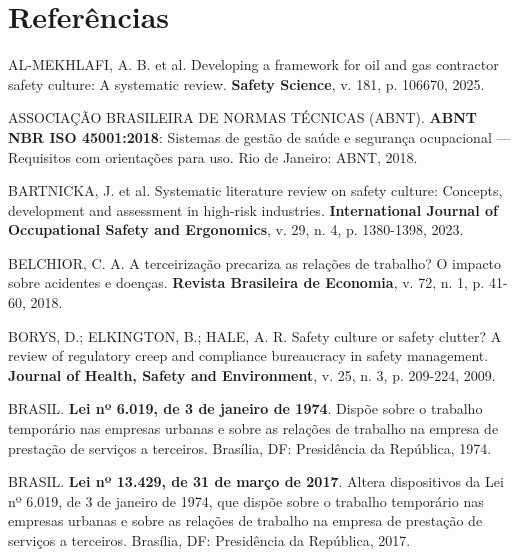 \documentclass[12pt,a4paper]{article}
\begin{document}
\section*{Referências}

\singlespacing
\fontsize{10}{12}\selectfont

\noindent AL-MEKHLAFI, A. B. et al. Developing a framework for oil and gas contractor safety culture: A systematic review. \textbf{Safety Science}, v. 181, p. 106670, 2025.

\vspace{0.25cm}
\noindent ASSOCIAÇÃO BRASILEIRA DE NORMAS TÉCNICAS (ABNT). \textbf{ABNT NBR ISO 45001:2018}: Sistemas de gestão de saúde e segurança ocupacional — Requisitos com orientações para uso. Rio de Janeiro: ABNT, 2018.

\vspace{0.25cm}
\noindent BARTNICKA, J. et al. Systematic literature review on safety culture: Concepts, development and assessment in high-risk industries. \textbf{International Journal of Occupational Safety and Ergonomics}, v. 29, n. 4, p. 1380-1398, 2023.

\vspace{0.25cm}
\noindent BELCHIOR, C. A. A terceirização precariza as relações de trabalho? O impacto sobre acidentes e doenças. \textbf{Revista Brasileira de Economia}, v. 72, n. 1, p. 41-60, 2018.

\vspace{0.25cm}
\noindent BORYS, D.; ELKINGTON, B.; HALE, A. R. Safety culture or safety clutter? A review of regulatory creep and compliance bureaucracy in safety management. \textbf{Journal of Health, Safety and Environment}, v. 25, n. 3, p. 209-224, 2009.

\vspace{0.25cm}
\noindent BRASIL. \textbf{Lei nº 6.019, de 3 de janeiro de 1974}. Dispõe sobre o trabalho temporário nas empresas urbanas e sobre as relações de trabalho na empresa de prestação de serviços a terceiros. Brasília, DF: Presidência da República, 1974.

\vspace{0.25cm}
\noindent BRASIL. \textbf{Lei nº 13.429, de 31 de março de 2017}. Altera dispositivos da Lei nº 6.019, de 3 de janeiro de 1974, que dispõe sobre o trabalho temporário nas empresas urbanas e sobre as relações de trabalho na empresa de prestação de serviços a terceiros. Brasília, DF: Presidência da República, 2017.
\end{document}
